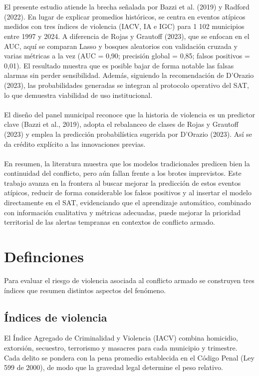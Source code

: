 \\\\
El presente estudio atiende la brecha señalada por Bazzi et al. (2019) y Radford (2022). En lugar de explicar promedios históricos, se centra en eventos atípicos medidos con tres índices de violencia (IACV, IA e IGC) para 1 102 municipios entre 1997 y 2024. A diferencia de Rojas y Grautoff (2023), que se enfocan en el AUC, aquí se comparan Lasso y bosques aleatorios con validación cruzada y varias métricas a la vez (AUC = 0,90; precisión global = 0,85; falsos positivos = 0,01). El resultado muestra que es posible bajar de forma notable las falsas alarmas sin perder sensibilidad. Además, siguiendo la recomendación de D’Orazio (2023), las probabilidades generadas se integran al protocolo operativo del SAT, lo que demuestra viabilidad de uso institucional.
\\\\
El diseño del panel municipal reconoce que la historia de violencia es un predictor clave (Bazzi et al., 2019), adopta el rebalanceo de clases de Rojas y Grautoff (2023) y emplea la predicción probabilística sugerida por D’Orazio (2023). Así se da crédito explícito a las innovaciones previas.
\\\\
En resumen, la literatura muestra que los modelos tradicionales predicen bien la continuidad del conflicto, pero aún fallan frente a los brotes imprevistos. Este trabajo avanza en la frontera al buscar mejorar la predicción de estos eventos atípicos, reducir de forma considerable los falsos positivos y al insertar el modelo directamente en el SAT, evidenciando que el aprendizaje automático, combinado con información cualitativa y métricas adecuadas, puede mejorar la prioridad territorial de las alertas tempranas en contextos de conflicto armado.


\section{Definciones}

Para evaluar el riesgo de violencia asociada al conflicto armado se construyen tres índices que resumen distintos aspectos del fenómeno.  

\subsection*{Índices de violencia}

El {Índice Agregado de Criminalidad y Violencia (IACV)} combina homicidio, extorsión, secuestro, terrorismo y masacres para cada municipio y trimestre.  
Cada delito se pondera con la pena promedio establecida en el Código Penal (Ley 599 de 2000), de modo que la gravedad legal determine el peso relativo.  


